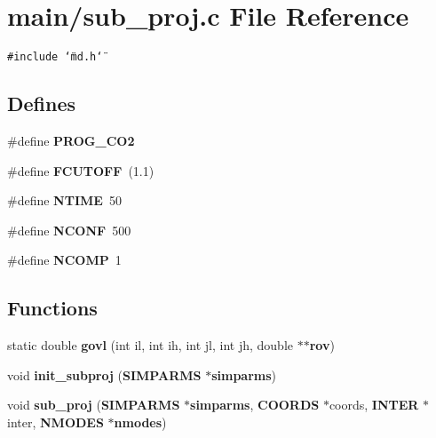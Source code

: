 \section{main/sub\_\-proj.c File Reference}
\label{sub__proj_8c}
{\tt \#include \char`\"{}md.h\char`\"{}}\par
\subsection*{Defines}
\begin{CompactItemize}
\item 
\#define {\bf PROG\_\-CO2}
\item 
\#define {\bf FCUTOFF}~(1.1)
\item 
\#define {\bf NTIME}~50
\item 
\#define {\bf NCONF}~500
\item 
\#define {\bf NCOMP}~1
\end{CompactItemize}
\subsection*{Functions}
\begin{CompactItemize}
\item 
static double {\bf govl} (int il, int ih, int jl, int jh, double $\ast$$\ast${\bf rov})
\item 
void {\bf init\_\-subproj} ({\bf SIMPARMS} $\ast${\bf simparms})
\item 
void {\bf sub\_\-proj} ({\bf SIMPARMS} $\ast${\bf simparms}, {\bf COORDS} $\ast$coords, {\bf INTER} $\ast$inter, {\bf NMODES} $\ast${\bf nmodes})
\end{CompactItemize}

